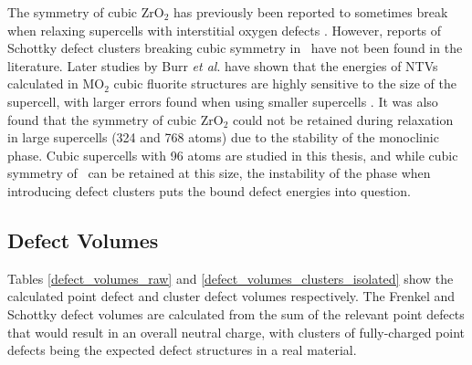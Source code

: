 The symmetry of cubic ZrO$_{2}$ has previously been reported to sometimes break when relaxing supercells with interstitial oxygen defects \cite{samanta2010thermodynamic}. However, reports of Schottky defect clusters breaking cubic symmetry in \zirconia\ have not been found in the literature. Later studies by Burr \emph{et al}. have shown that the energies of NTVs calculated in MO$_{2}$ cubic fluorite structures are highly sensitive to the size of the supercell, with larger errors found when using smaller supercells \cite{burr2017importance}. It was also found that the symmetry of cubic ZrO$_{2}$ could not be retained during relaxation in large supercells (324 and 768 atoms) due to the stability of the monoclinic phase. Cubic supercells with 96 atoms are studied in this thesis, and while cubic symmetry of \zirconia\ can be retained at this size, the instability of the phase when introducing defect clusters puts the bound defect energies into question.


\subsection{Defect Volumes} \label{defect_volumes_r1}

Tables \ref{defect_volumes_raw} and \ref{defect_volumes_clusters_isolated} show the calculated point defect and cluster defect volumes respectively. The Frenkel and Schottky defect volumes are calculated from the sum of the relevant point defects that would result in an overall neutral charge, with clusters of fully-charged point defects being the expected defect structures in a real material.

